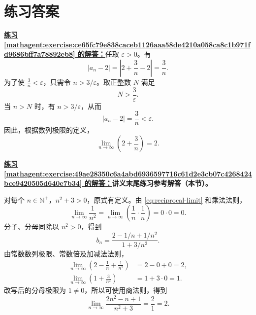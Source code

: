 \documentclass[UTF8,fontset=fandol,11pt]{ctexart}
\begin{document}
\section*{练习答案}
\par\noindent\textbf{\hyperref[mathagent:exercise:ce65fc79e838caceb1126aaa58de4210a058ca8c1b971fd9686bff7a78892eb8]{练习 \ref*{mathagent:exercise:ce65fc79e838caceb1126aaa58de4210a058ca8c1b971fd9686bff7a78892eb8} 的解答：}}任取 $\varepsilon>0$。有
\[
\left|a_n-2\right|=\left|2+\frac{3}{n}-2\right|=\frac{3}{n}.
\]
为了使 $\frac{3}{n}<\varepsilon$，只需令 $n>3/\varepsilon$。取正整数 $N$ 满足
\[
N>\frac{3}{\varepsilon}.
\]
当 $n>N$ 时，有 $n>3/\varepsilon$，从而
\[
\left|a_n-2\right|=\frac{3}{n}<\varepsilon.
\]
因此，根据数列极限的定义，
\[
\lim_{n\to\infty}\left(2+\frac{3}{n}\right)=2.
\]\par
\par\noindent\textbf{\hyperref[mathagent:exercise:49ae28350c6a4abd6936597716c61d2e3cb07c4268424bce9420505d640e7b34]{练习 \ref*{mathagent:exercise:49ae28350c6a4abd6936597716c61d2e3cb07c4268424bce9420505d640e7b34} 的解答：}}\textbf{讲义末尾练习参考解答（本节）。}

对每个 $n\in\mathbb{N}^+$，$n^2+3>0$，原式有定义。由 \eqref{eq:reciprocal-limit} 和乘法法则，
\[
\lim_{n\to\infty}\frac{1}{n^2}
=\lim_{n\to\infty}\left(\frac{1}{n}\cdot\frac{1}{n}\right)
=0\cdot0=0.
\]
分子、分母同除以 $n^2>0$，得到
\[
b_n=\frac{2-1/n+1/n^2}{1+3/n^2}.
\]
由常数数列极限、常数倍及加减法法则，
\[
\begin{aligned}
\lim_{n\to\infty}\left(2-\frac{1}{n}+\frac{1}{n^2}\right)&=2-0+0=2,\\
\lim_{n\to\infty}\left(1+\frac{3}{n^2}\right)&=1+3\cdot0=1.
\end{aligned}
\]
改写后的分母极限为 $1\ne0$，所以可使用商法则，得到
\[
\lim_{n\to\infty}\frac{2n^2-n+1}{n^2+3}=\frac{2}{1}=2.
\]\par
\end{document}
